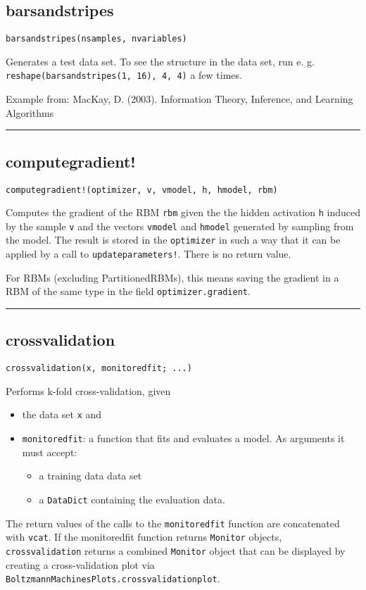 \subsection*{barsandstripes}
\begin{verbatim}
barsandstripes(nsamples, nvariables)
\end{verbatim}
Generates a test data set. To see the structure in the data set, run e. g. \texttt{reshape(barsandstripes(1, 16), 4, 4)} a few times.

Example from: MacKay, D. (2003). Information Theory, Inference, and Learning Algorithms

\noindent\rule{\textwidth}{1pt}
\subsection*{computegradient!}
\begin{verbatim}
computegradient!(optimizer, v, vmodel, h, hmodel, rbm)
\end{verbatim}
Computes the gradient of the RBM \texttt{rbm} given the the hidden activation \texttt{h} induced by the sample \texttt{v} and the vectors \texttt{vmodel} and \texttt{hmodel} generated by sampling from the model. The result is stored in the \texttt{optimizer} in such a way that it can be applied by a call to \texttt{updateparameters!}. There is no return value.

For RBMs (excluding PartitionedRBMs), this means saving the gradient in a RBM of the same type in the field \texttt{optimizer.gradient}.

\noindent\rule{\textwidth}{1pt}
\subsection*{crossvalidation}
\begin{verbatim}
crossvalidation(x, monitoredfit; ...)
\end{verbatim}
Performs k-fold cross-validation, given

\begin{itemize}
\item the data set \texttt{x} and


\item \texttt{monitoredfit}: a function that fits and evaluates a model. As arguments it must accept:

\begin{itemize}
\item a training data data set


\item a \texttt{DataDict} containing the evaluation data.

\end{itemize}
\end{itemize}
The return values of the calls to the \texttt{monitoredfit} function are concatenated with \texttt{vcat}. If the monitoredfit function returns \texttt{Monitor} objects, \texttt{crossvalidation} returns a combined \texttt{Monitor} object that can be displayed by creating a cross-validation plot via \texttt{BoltzmannMachinesPlots.crossvalidationplot}.

